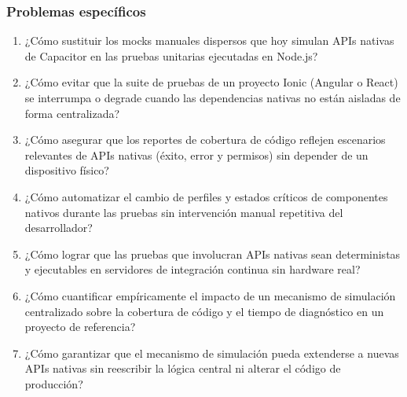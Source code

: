 \subsubsection{Problemas específicos}
\label{sec:problemas_especificos}

\begin{enumerate}[label=\arabic*., leftmargin=*]
    \item \label{prob:simulador}
    ¿Cómo sustituir los mocks manuales dispersos que hoy simulan APIs nativas de Capacitor en las pruebas unitarias ejecutadas en Node.js?

    \item \label{prob:integracion}
    ¿Cómo evitar que la suite de pruebas de un proyecto Ionic (Angular o React) se interrumpa o degrade cuando las dependencias nativas no están aisladas de forma centralizada?

    \item \label{prob:cobertura}
    ¿Cómo asegurar que los reportes de cobertura de código reflejen escenarios relevantes de APIs nativas (éxito, error y permisos) sin depender de un dispositivo físico?

    \item \label{prob:mcp}
    ¿Cómo automatizar el cambio de perfiles y estados críticos de componentes nativos durante las pruebas sin intervención manual repetitiva del desarrollador?

    \item \label{prob:mcp_valor}
    ¿Cómo lograr que las pruebas que involucran APIs nativas sean deterministas y ejecutables en servidores de integración continua sin hardware real?

    \item \label{prob:metricas}
    ¿Cómo cuantificar empíricamente el impacto de un mecanismo de simulación centralizado sobre la cobertura de código y el tiempo de diagnóstico en un proyecto de referencia?

    \item \label{prob:transferencia}
    ¿Cómo garantizar que el mecanismo de simulación pueda extenderse a nuevas APIs nativas sin reescribir la lógica central ni alterar el código de producción?
\end{enumerate}
